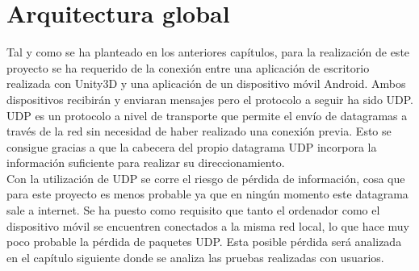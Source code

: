 \section{Arquitectura global}
\label{cap4:sec:global}

Tal y como se ha planteado en los anteriores cap\'itulos, para la realizaci\'on de este proyecto se ha requerido de la conexi\'on entre una aplicaci\'on de escritorio realizada con Unity3D y una aplicaci\'on de un dispositivo m\'ovil Android. Ambos dispositivos recibir\'an y enviaran mensajes pero el protocolo a seguir ha sido UDP. UDP es un protocolo a nivel de transporte que permite el env\'io de datagramas a trav\'es de la red sin necesidad de haber realizado una conexi\'on previa. Esto se consigue gracias a que la cabecera del propio datagrama UDP incorpora la informaci\'on suficiente para realizar su direccionamiento.
\\
Con la utilizaci\'on de UDP se corre el riesgo de p\'erdida de informaci\'on, cosa que para este proyecto es menos probable ya que en ning\'un momento este datagrama sale a internet. Se ha puesto como requisito que tanto el ordenador como el dispositivo m\'ovil se encuentren conectados a la misma red local, lo que hace muy poco probable la p\'erdida de paquetes UDP. Esta posible p\'erdida ser\'a analizada en el cap\'itulo siguiente donde se analiza las pruebas realizadas con usuarios.
\\
\begin{figure}[h]

\end{figure}

